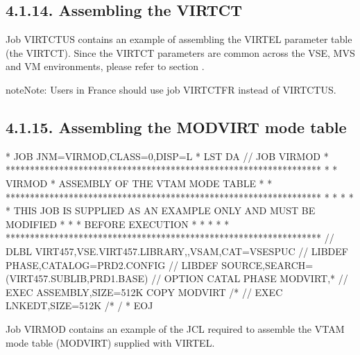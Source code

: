 \documentclass[letterpaper,10pt,english]{sphinxmanual}
\begin{document}
\subsection{4.1.14. Assembling the VIRTCT}
\label{\detokenize{Installation_Guide:assembling-the-virtct}}
Job VIRTCTUS contains an example of assembling the VIRTEL parameter table (the VIRTCT). Since the VIRTCT parameters are common across the VSE, MVS and VM environments, please refer to section {\hyperref[\detokenize{Installation_Guide:v457ig-bookmark01}]{}}.

\begin{sphinxadmonition}{note}{Note:}
Users in France should use job VIRTCTFR instead of VIRTCTUS.
\end{sphinxadmonition}


\subsection{4.1.15. Assembling the MODVIRT mode table}
\label{\detokenize{Installation_Guide:assembling-the-modvirt-mode-table}}
\begin{sphinxVerbatim}[commandchars=\\\{\}]
* \PYGZdl{}\PYGZdl{} JOB JNM=VIRMOD,CLASS=0,DISP=L
* \PYGZdl{}\PYGZdl{} LST DA
// JOB VIRMOD
* *****************************************************************
* * VIRMOD * ASSEMBLY OF THE VTAM MODE TABLE *
* *****************************************************************
* * *
* * THIS JOB IS SUPPLIED AS AN EXAMPLE ONLY AND MUST BE MODIFIED *
* * BEFORE EXECUTION *
* * *
* *****************************************************************
// DLBL VIRT457,\PYGZsq{}VSE.VIRT457.LIBRARY\PYGZsq{},,VSAM,CAT=VSESPUC
// LIBDEF PHASE,CATALOG=PRD2.CONFIG
// LIBDEF SOURCE,SEARCH=(VIRT457.SUBLIB,PRD1.BASE)
// OPTION CATAL
  PHASE MODVIRT,*
// EXEC ASSEMBLY,SIZE=512K
  COPY MODVIRT
/*
// EXEC LNKEDT,SIZE=512K
/*
/\PYGZam{}
* \PYGZdl{}\PYGZdl{} EOJ
\end{sphinxVerbatim}


Job VIRMOD contains an example of the JCL required to assemble the VTAM mode table (MODVIRT) supplied with VIRTEL.
\end{document}
